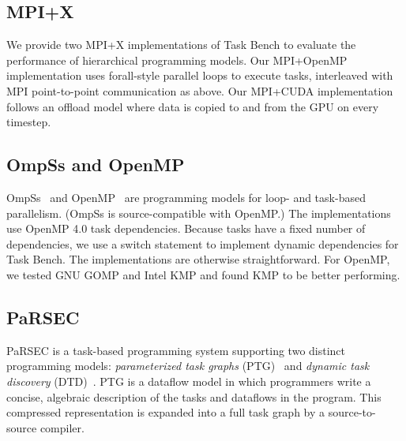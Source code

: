 \subsection{MPI+X}

We provide two MPI+X implementations of Task Bench to evaluate the
performance of hierarchical programming models. Our MPI+OpenMP
implementation uses forall-style parallel loops to execute tasks,
interleaved with MPI point-to-point communication as above. Our
MPI+CUDA implementation follows an offload model where data is copied
to and from the GPU on every timestep.

\subsection{OmpSs and OpenMP}

OmpSs~\cite{OmpSs11} and OpenMP~\cite{OpenMPSpec40} are programming
models for loop- and task-based parallelism. (OmpSs is
source-compatible with OpenMP.) The implementations use OpenMP 4.0
task dependencies.  Because tasks have a fixed number of dependencies,
we use a switch statement to implement dynamic dependencies for Task
Bench. The implementations are otherwise straightforward.  For OpenMP,
we tested GNU GOMP and Intel KMP and found KMP to be better
performing.




\subsection{PaRSEC}

PaRSEC is a task-based programming system supporting two distinct
programming models: \emph{parameterized task graphs}
(PTG)~\cite{PARSEC13} and \emph{dynamic task discovery}
(DTD)~\cite{PARSEC_DTD}.  PTG is a dataflow model in which programmers
write a concise, algebraic description of the tasks and dataflows in
the program. This compressed representation is expanded into a full
task graph by a source-to-source compiler.

